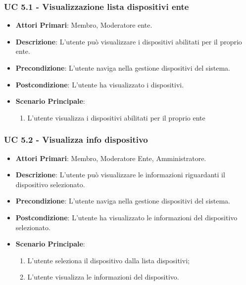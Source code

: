 			
			\subsubsection{UC 5.1 - Visualizzazione lista dispositivi ente}
			\begin{itemize}
				\item \textbf{Attori Primari}: Membro, Moderatore ente.
				\item \textbf{Descrizione}: L'utente può visualizzare i dispositivi abilitati per il proprio ente.
				\item \textbf{Precondizione}: L'utente naviga nella gestione dispositivi del sistema.
				\item \textbf{Postcondizione}: L'utente ha visualizzato i dispositivi.
				\item \textbf{Scenario Principale}:
				\begin{enumerate}
					\item{L'utente visualizza i dispositivi abilitati per il proprio ente}
				\end{enumerate}
			\end{itemize}
			
			\subsubsection{UC 5.2 - Visualizza info dispositivo}
			\begin{itemize}
				\item \textbf{Attori Primari}: Membro, Moderatore Ente, Amministratore.
				\item \textbf{Descrizione}: L'utente può visualizzare le informazioni riguardanti il dispositivo selezionato.
				\item \textbf{Precondizione}: L'utente naviga nella gestione dispositivi del sistema.
				\item \textbf{Postcondizione}: L'utente ha visualizzato le informazioni del dispositivo selezionato.
				\item \textbf{Scenario Principale}:
				\begin{enumerate}
					\item{L'utente seleziona il dispositivo dalla lista dispositivi;}
					\item{L'utente visualizza le informazioni del dispositivo.}
				\end{enumerate}
			\end{itemize}
			
